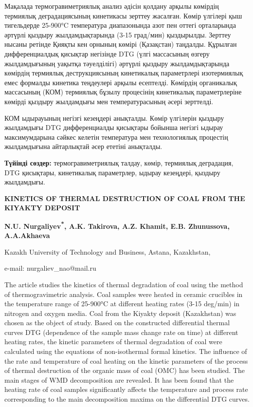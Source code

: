 Мақалада термогравиметриялық анализ әдісін қолдану арқылы көмірдің
термиялық деградациясының кинетикасы зерттеу жасалған. Көмір үлгілері
қыш тигельдерде 25-900°C температура диапазонында азот пен оттегі
орталарында әртүрлі қыздыру жылдамдықтарында (3-15 град/мин)
қыздырылды. Зерттеу нысаны ретінде Қияқты кен орнының көмірі (Қазақстан)
таңдалды. Құрылған дифференциалдық қисықтар негізінде DTG (үлгі
массасының өзгеру жылдамдығының уақытқа тәуелділігі) әртүрлі қыздыру
жылдамдықтарында көмірдің термиялық деструкциясының кинетикалық
параметрлері изотермиялық емес формалды кинетика теңдеулері арқылы
есептелді. Көмірдің органикалық массасының (КОМ) термиялық бұзылу
процесінің кинетикалық параметрлеріне көмірді қыздыру жылдамдығы мен
температурасының әсері зерттелді.

КОМ ыдырауының негізгі кезеңдері анықталды. Көмір үлгілерін қыздыру
жылдамдығы DTG дифференциалды қисықтары бойынша негізгі ыдырау
максимумдарына сәйкес келетін температура мен технологиялық процестің
жылдамдығына айтарлықтай әсер ететіні анықталды.

\begin{center}
{\large\bfseries Түйінді сөздер:} термогравиметриялық талдау, көмір, термиялық
деградация, DTG қисықтары, кинетикалық параметрлер, ыдырау кезеңдері,
қыздыру жылдамдығы.

{\bfseries KINETICS OF THERMAL DESTRUCTION OF COAL FROM THE KIYAKTY
DEPOSIT}

\vspace{1em}
{\bfseries N.U. Nurgaliyev\textsuperscript{*}, A.K. Takirova, A.Z. Khamit,
E.B. Zhunussova, A.A.Akhaeva}

Kazakh University of Technology and Business, Astana, Kazakhstan,

e-mail: nurgaliev\_nao@mail.ru
\end{center}

The article studies the kinetics of thermal degradation of coal using
the method of thermogravimetric analysis. Coal samples were heated in
ceramic crucibles in the temperature range of 25-900°C at different
heating rates (3-15 deg/min) in nitrogen and oxygen media. Coal from
the Kiyakty deposit (Kazakhstan) was chosen as the object of study.
Based on the constructed differential thermal curves DTG (dependence of
the sample mass change rate on time) at different heating rates, the
kinetic parameters of thermal degradation of coal were calculated using
the equations of non-isothermal formal kinetics. The influence of the
rate and temperature of coal heating on the kinetic parameters of the
process of thermal destruction of the organic mass of coal (OMC) has
been studied. The main stages of WMD decomposition are revealed. It has
been found that the heating rate of coal samples significantly affects
the temperature and process rate corresponding to the main decomposition
maxima on the differential DTG curves.

